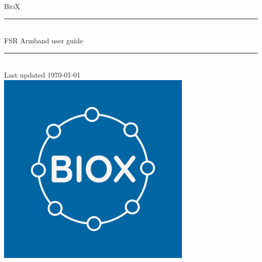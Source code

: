 \begin{titlepage}
\newcommand{\HRule}{\rule{\linewidth}{0.5mm}} %

\center %
 

\textsc{\LARGE BioX}\\[1.4cm] 


\HRule \\[0.4cm]
{\Large FSR Armband user guide}\\[0.4cm] 
\HRule \\[1.2cm]
 




{\large Last updated \today}\\[1.5cm] %

\vspace{1cm}
\includegraphics[width=0.7\textwidth]{figures/AppPics/Blue_white_ring.png} %
 
\end{titlepage}